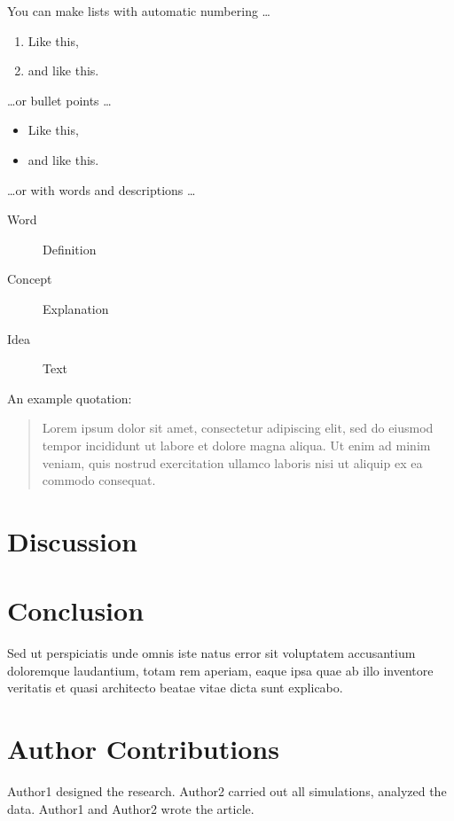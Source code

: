 \documentclass{biophys-new}
\begin{document}
You can make lists with automatic numbering \dots

\begin{enumerate}
\item Like this,
\item and like this.
\end{enumerate}

\dots or bullet points \dots

\begin{itemize} 
\item Like this,
\item and like this.
\end{itemize}

\dots or with words and descriptions \dots

\begin{description}
\item[Word] Definition
\item[Concept] Explanation
\item[Idea] Text
\end{description}

An example quotation:

\begin{quote}
Lorem ipsum dolor sit amet, consectetur adipiscing elit, sed do eiusmod tempor incididunt ut labore et dolore magna aliqua. Ut enim ad minim veniam, quis nostrud exercitation ullamco laboris nisi ut aliquip ex ea commodo consequat.
\end{quote}


\section*{Discussion}


\section*{Conclusion}

Sed ut perspiciatis unde omnis iste natus error sit voluptatem accusantium doloremque laudantium, totam rem aperiam, eaque ipsa quae ab illo inventore veritatis et quasi architecto beatae vitae dicta sunt explicabo. 

\section*{Author Contributions}

Author1 designed the research. Author2 carried out all simulations, analyzed the data. Author1 and Author2 wrote the article. 
\end{document}

